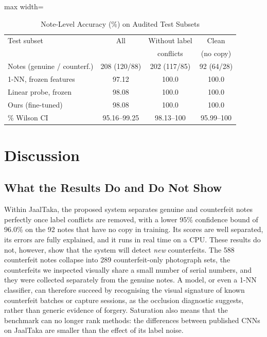 \documentclass[journal]{IEEEtran}
\begin{document}
\begin{table}[!t]
\caption{Note-Level Accuracy (\%) on Audited Test Subsets}
\label{tab:clean}
\centering
\footnotesize
\setlength{\tabcolsep}{4pt}
\begin{adjustbox}{max width=\columnwidth}
\begin{tabular}{@{}lccc@{}}
\toprule
Test subset & All & Without label & Clean \\
& & conflicts & (no copy) \\
\midrule
Notes (genuine / counterf.) & 208 (120/88) & 202 (117/85) & 92 (64/28) \\
\midrule
1-NN, frozen features & 97.12 & 100.0 & 100.0 \\
Linear probe, frozen & 98.08 & 100.0 & 100.0 \\
Ours (fine-tuned) & 98.08 & 100.0 & 100.0 \\
\quad 95\% Wilson CI & 95.16--99.25 & 98.13--100 & 95.99--100 \\
\bottomrule
\end{tabular}
\end{adjustbox}
\end{table}

\section{Discussion}
\label{sec:discussion}

\subsection{What the Results Do and Do Not Show}
Within JaalTaka, the proposed system separates genuine and counterfeit notes perfectly
once label conflicts are removed, with a lower 95\% confidence bound of 96.0\% on the
92 notes that have no copy in training. Its scores are well separated, its errors are
fully explained, and it runs in real time on a CPU. These results do not, however, show
that the system will detect \emph{new} counterfeits. The 588 counterfeit notes collapse
into 289 counterfeit-only photograph sets, the counterfeits we inspected visually share
a small number of serial numbers, and they were collected separately from the genuine
notes. A model, or even a 1-NN classifier, can therefore succeed by recognising
the visual signature of known counterfeit batches or capture sessions, as the occlusion
diagnostic suggests, rather than generic evidence of forgery. Saturation also means
that the benchmark can no longer rank methods: the differences between published CNNs
on JaalTaka are smaller than the effect of its label noise.
\end{document}
